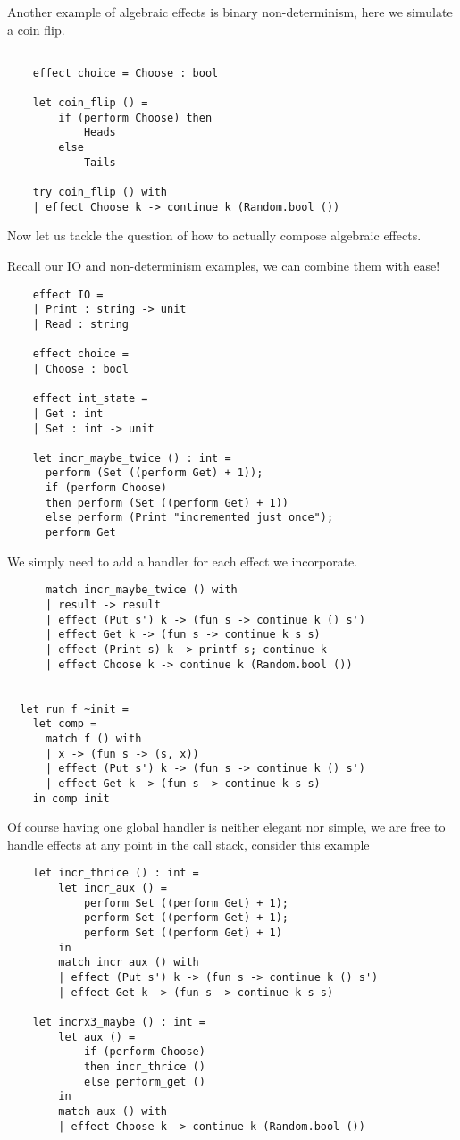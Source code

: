 Another example of algebraic effects is binary non-determinism,
here we simulate a coin flip.\\
\begin{example}\begin{verbatim}

    effect choice = Choose : bool

    let coin_flip () =
        if (perform Choose) then
            Heads
        else
            Tails

    try coin_flip () with
    | effect Choose k -> continue k (Random.bool ())
    \end{verbatim}
\end{example}
Now let us tackle the question of how to actually compose
algebraic effects.\\

\begin{example}
    Recall our IO and non-determinism examples,
    we can combine them with ease!
\begin{verbatim}
    effect IO =
    | Print : string -> unit
    | Read : string

    effect choice =
    | Choose : bool

    effect int_state =
    | Get : int
    | Set : int -> unit

    let incr_maybe_twice () : int =
      perform (Set ((perform Get) + 1));
      if (perform Choose)
      then perform (Set ((perform Get) + 1))
      else perform (Print "incremented just once");
      perform Get
\end{verbatim}
    We simply need to add a handler for each effect we incorporate.
\begin{verbatim}
      match incr_maybe_twice () with
      | result -> result
      | effect (Put s') k -> (fun s -> continue k () s')
      | effect Get k -> (fun s -> continue k s s)
      | effect (Print s) k -> printf s; continue k
      | effect Choose k -> continue k (Random.bool ())


  let run f ~init =
    let comp =
      match f () with
      | x -> (fun s -> (s, x))
      | effect (Put s') k -> (fun s -> continue k () s')
      | effect Get k -> (fun s -> continue k s s)
    in comp init
\end{verbatim}
\end{example}

Of course having one global handler is neither elegant nor simple,
we are free to handle effects at any point in the call stack,
consider this example
\begin{verbatim}
    let incr_thrice () : int =
        let incr_aux () =
            perform Set ((perform Get) + 1);
            perform Set ((perform Get) + 1);
            perform Set ((perform Get) + 1)
        in
        match incr_aux () with
        | effect (Put s') k -> (fun s -> continue k () s')
        | effect Get k -> (fun s -> continue k s s)

    let incrx3_maybe () : int =
        let aux () =
            if (perform Choose)
            then incr_thrice ()
            else perform_get ()
        in
        match aux () with
        | effect Choose k -> continue k (Random.bool ())
\end{verbatim}

